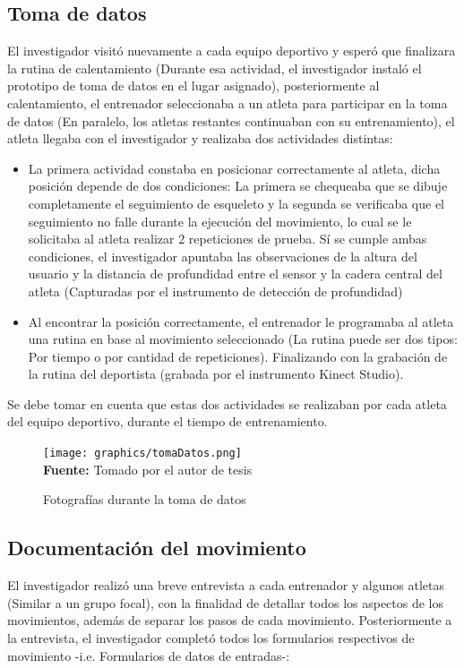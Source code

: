 \subsection{Toma de datos}
El investigador visit\'o nuevamente a cada equipo deportivo y esper\'o que finalizara la rutina de calentamiento (Durante esa actividad, el investigador instal\'o el prototipo de toma de datos en el lugar asignado), posteriormente al calentamiento, el entrenador seleccionaba a un atleta para participar en la toma de datos (En paralelo, los atletas restantes continuaban con su entrenamiento), el atleta llegaba con el investigador y realizaba dos actividades distintas:
\begin{itemize}
\item La primera actividad constaba en posicionar correctamente al atleta, dicha posici\'on depende de dos condiciones: La primera se chequeaba que se dibuje completamente el seguimiento de esqueleto y la segunda se verificaba que el seguimiento no falle durante la ejecuci\'on del movimiento, lo cual se le solicitaba al atleta realizar 2 repeticiones de prueba. S\'i se cumple ambas condiciones, el investigador apuntaba las observaciones de la altura del usuario y la distancia de profundidad entre el sensor y la cadera central del atleta (Capturadas por el instrumento de detecci\'on de profundidad)
\item Al encontrar la posici\'on correctamente, el entrenador le programaba al atleta una rutina en base al movimiento seleccionado (La rutina puede ser dos tipos: Por tiempo o por cantidad de repeticiones). Finalizando con la grabaci\'on de la rutina del deportista (grabada por el instrumento Kinect Studio).
\end{itemize}
Se debe tomar en cuenta que estas dos actividades se realizaban por cada atleta del equipo deportivo, durante el tiempo de entrenamiento.
 \begin{figure}[H]
	\caption{Fotograf\'ias durante la toma de datos}
	\label{fig:getDataStep}
	\centering
	\texttt{[image: graphics/tomaDatos.png]} \\
	\textbf{Fuente:} Tomado por el autor de tesis
\end{figure} 
\subsection{Documentaci\'on del movimiento}
El investigador realiz\'o una breve entrevista a cada entrenador y algunos atletas (Similar a un grupo focal), con la finalidad de detallar todos los aspectos de los movimientos, adem\'as de separar los pasos de cada movimiento. Posteriormente a la entrevista, el investigador complet\'o todos los formularios respectivos de movimiento -i.e. Formularios de datos de entradas-:
